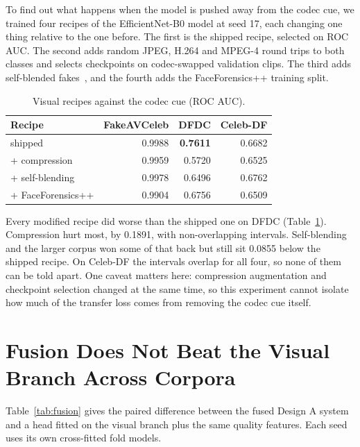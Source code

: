 To find out what happens when the model is pushed away from the codec cue,
we trained four recipes of the EfficientNet-B0 model at seed 17, each changing one thing relative to
the one before. The first is the shipped recipe, selected on ROC AUC. The
second adds random JPEG, H.264 and MPEG-4 round trips to both classes and
selects checkpoints on codec-swapped validation clips. The third adds
self-blended fakes~\cite{sbi}, and the fourth adds the FaceForensics++
training split.

\begin{table}[ht]
    \centering
    \caption{Visual recipes against the codec cue (ROC AUC).}
    \label{tab:recipes}
    \begin{tabular}{lrrr}
        \toprule
        \textbf{Recipe} & \textbf{FakeAVCeleb} & \textbf{DFDC} & \textbf{Celeb-DF} \\
        \midrule
        shipped & 0.9988 & \textbf{0.7611} & 0.6682 \\
        + compression & 0.9959 & 0.5720 & 0.6525 \\
        + self-blending & 0.9978 & 0.6496 & 0.6762 \\
        + FaceForensics++ & 0.9904 & 0.6756 & 0.6509 \\
        \bottomrule
    \end{tabular}
\end{table}

Every modified recipe did worse than the shipped one on DFDC
(Table~\ref{tab:recipes}). Compression hurt most, by 0.1891, with
non-overlapping intervals. Self-blending and the larger corpus won some of that
back but still sit 0.0855 below the shipped recipe. On Celeb-DF the intervals
overlap for all four, so none of them can be told apart. One caveat matters
here: compression augmentation and checkpoint selection changed at the same
time, so this experiment cannot isolate how much of the transfer loss comes
from removing the codec cue itself.

\section{Fusion Does Not Beat the Visual Branch Across Corpora}

Table~\ref{tab:fusion} gives the paired difference between the fused Design A
system and a head fitted on the visual branch plus the same quality features.
Each seed uses its own cross-fitted fold models.

